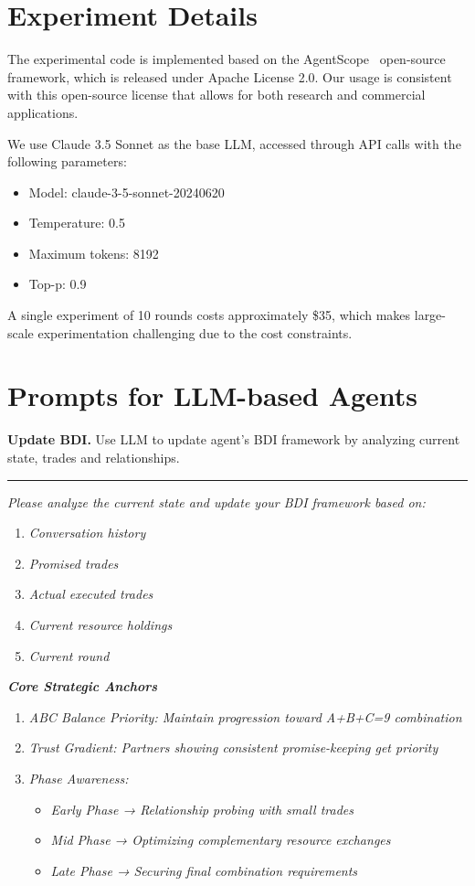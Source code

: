 \section{Experiment Details}\label{sec:details}

The experimental code is implemented based on the AgentScope~\cite{gao2024agentscope} open-source framework, which is released under Apache License 2.0. Our usage is consistent with this open-source license that allows for both research and commercial applications.

We use Claude 3.5 Sonnet as the base LLM, accessed through API calls with the following parameters:
\begin{itemize}
\item Model: claude-3-5-sonnet-20240620
\item Temperature: 0.5
\item Maximum tokens: 8192
\item Top-p: 0.9
\end{itemize}
A single experiment of 10 rounds costs approximately \$35, which makes large-scale experimentation challenging due to the cost constraints. 

\section{Prompts for LLM-based Agents}\label{sec:prompt}

\textbf{Update BDI.} Use LLM to update agent's BDI framework by analyzing current state, trades and relationships.

\noindent\rule{\linewidth}{0.8pt}
\textit{Please analyze the current state and update your BDI framework based on:}
\begin{enumerate}
    \item \textit{Conversation history}
    \item \textit{Promised trades}
    \item \textit{Actual executed trades}
    \item \textit{Current resource holdings}
    \item \textit{Current round}
\end{enumerate}

\textbf{\textit{Core Strategic Anchors}}
\begin{enumerate}
    \item \textit{ABC Balance Priority: Maintain progression toward A+B+C=9 combination}
    \item \textit{Trust Gradient: Partners showing consistent promise-keeping get priority}
    \item \textit{Phase Awareness:}
    \begin{itemize}
        \item[] \textit{Early Phase → Relationship probing with small trades} 
        \item[] \textit{Mid Phase → Optimizing complementary resource exchanges}
        \item[] \textit{Late Phase → Securing final combination requirements}
    \end{itemize}
\end{enumerate}
     

